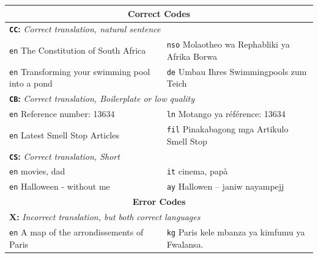 \begin{table}[th]
    \small
    \centering
    \begin{tabular}{|ll|}
        \hline
        \hline
        \multicolumn{2}{|c|}{\textbf{Correct Codes}}                                                                                \\
        \hline
        \multicolumn{2}{|l|}{\textbf{\texttt{CC}:} \textit{Correct translation, natural sentence}}                                  \\
        \hdashline
        \texttt{en} The Constitution of South Africa            & \texttt{nso} Molaotheo wa Rephabliki ya Afrika Borwa              \\
        \texttt{en} Transforming your swimming pool into a pond & \texttt{de} Umbau Ihres Swimmingpools zum Teich                   \\
        \hline
        \multicolumn{2}{|l|}{\textbf{\texttt{CB}:} \textit{Correct translation, Boilerplate or low quality}}                        \\
        \hdashline
        \texttt{en} Reference number: 13634                     & \texttt{ln} Motango ya référence: 13634                           \\
        \texttt{en} Latest Smell Stop Articles                  & \texttt{fil} Pinakabagong mga Artikulo Smell Stop                 \\
        \hline
        \multicolumn{2}{|l|}{\textbf{\texttt{CS}:} \textit{Correct translation, Short}}                                             \\
        \hdashline
        \texttt{en} movies, dad                                 & \texttt{it} cinema, pap\`{a}                                      \\
        \texttt{en} Halloween - without me                      & \texttt{ay} Hallowen – janiw nayampejj                            \\
        \hline
        \hline
        \multicolumn{2}{|c|}{\textbf{Error Codes}}                                                                                  \\
        \hline
        \multicolumn{2}{|l|}{\textbf{X:} \textit{Incorrect translation, but both correct languages}}                                \\
        \hdashline
        \texttt{en} A map of the arrondissements of Paris       & \texttt{kg} Paris kele mbanza ya kimfumu ya Fwalansa.             \\

\end{tabular}
\end{table}
